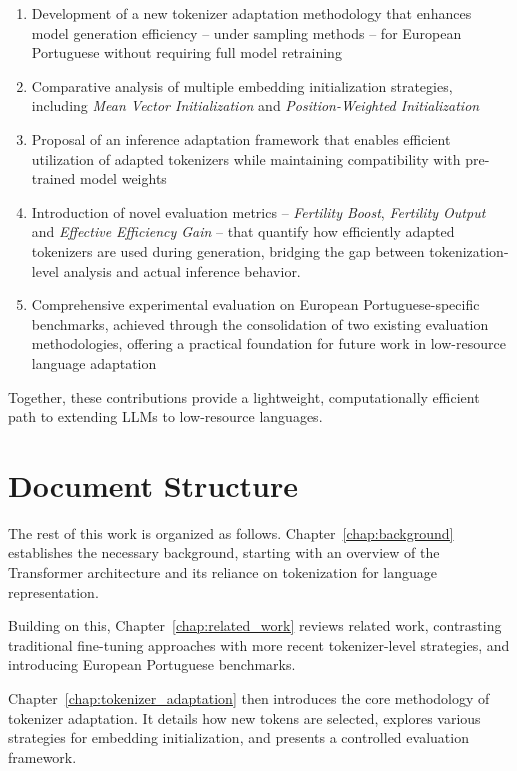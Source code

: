\begin{enumerate}
    \item Development of a new tokenizer adaptation methodology that enhances model generation efficiency -- under sampling methods -- for European Portuguese without requiring full model retraining
    
    \item Comparative analysis of multiple embedding initialization strategies, including \emph{Mean Vector Initialization} and \emph{Position-Weighted Initialization}
    
    \item Proposal of an inference adaptation framework that enables efficient utilization of adapted tokenizers while maintaining compatibility with pre-trained model weights

    \item Introduction of novel evaluation metrics -- \textit{Fertility Boost}, \textit{Fertility Output} and \textit{Effective Efficiency Gain} -- that quantify how efficiently adapted tokenizers are used during generation, bridging the gap between tokenization-level analysis and actual inference behavior.
    
    \item Comprehensive experimental evaluation on European Portuguese-specific benchmarks, achieved through the consolidation of two existing evaluation methodologies, offering a practical foundation for future work in low-resource language adaptation
\end{enumerate}

Together, these contributions provide a lightweight, computationally efficient path to extending LLMs to low-resource languages.


\section{Document Structure}\label{Section1.5}

The rest of this work is organized as follows. Chapter~\ref{chap:background} establishes the necessary background, starting with an overview of the Transformer architecture and its reliance on tokenization for language representation.

Building on this, Chapter~\ref{chap:related_work} reviews related work, contrasting traditional fine-tuning approaches with more recent tokenizer-level strategies, and introducing European Portuguese benchmarks.

Chapter~\ref{chap:tokenizer_adaptation} then introduces the core methodology of tokenizer adaptation. It details how new tokens are selected, explores various strategies for embedding initialization, and presents a controlled evaluation framework.

